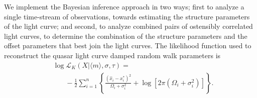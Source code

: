 \documentclass{emulateapj}
\begin{document}
We implement the Bayesian inference approach in two ways; first to analyze a single time-stream
of observations, towards estimating the structure parameters of the
light curve; and second, to analyze combined pairs of ostensibly
correlated light curves, to determine the combination of the structure
parameters and the offset parameters that best join the light
curves. The likelihood function used to reconstruct the quasar light
curve damped random walk parameters is
\begin{align} 
& \log\mathcal{L}_{K}(X | \langle m\rangle, \sigma,\tau) =\nonumber \\
& \ \ \ \ \ \ \ \ -\frac{1}{2}\sum_{i=1}^{n}\left\{
\frac{\left(\hat{x}_i-x^{*}_i\right)^2}{\Omega_i+\sigma_i^2} 
+ 
\log\left[2\pi\left(\Omega_i+\sigma_i^2\right)\right]
\right\}. 
\end{align}
\end{document}
